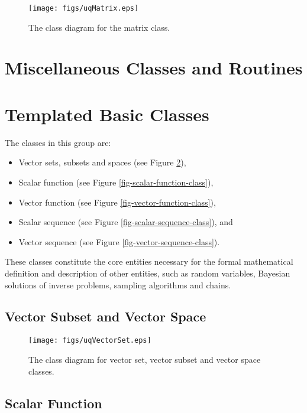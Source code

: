 \begin{figure}[h!]
\centerline{
\texttt{[image: figs/uqMatrix.eps]}
}
\caption{
The class diagram for the matrix class.
}
\label{fig-matrix-class}
\end{figure}

\clearpage
\section{Miscellaneous Classes and Routines}

\clearpage
\section{Templated Basic Classes}

The classes in this group are:
\begin{itemize}
\item Vector sets, subsets and spaces (see Figure \ref{fig-vector-space-subset-classes}),
\item Scalar function (see Figure \ref{fig-scalar-function-class}),
\item Vector function (see Figure \ref{fig-vector-function-class}),
\item Scalar sequence (see Figure \ref{fig-scalar-sequence-class}), and
\item Vector sequence (see Figure \ref{fig-vector-sequence-class}).
\end{itemize}
These classes constitute the core entities necessary for the formal
mathematical definition and description of other entities, such as
random variables, Bayesian solutions of inverse problems, sampling algorithms and chains.

\clearpage
\subsection{Vector Subset and Vector Space}

\begin{figure}[h!]
\centerline{
\texttt{[image: figs/uqVectorSet.eps]}
}
\caption{
The class diagram for vector set, vector subset and vector space classes.
}
\label{fig-vector-space-subset-classes}
\end{figure}

\clearpage
\subsection{Scalar Function}

